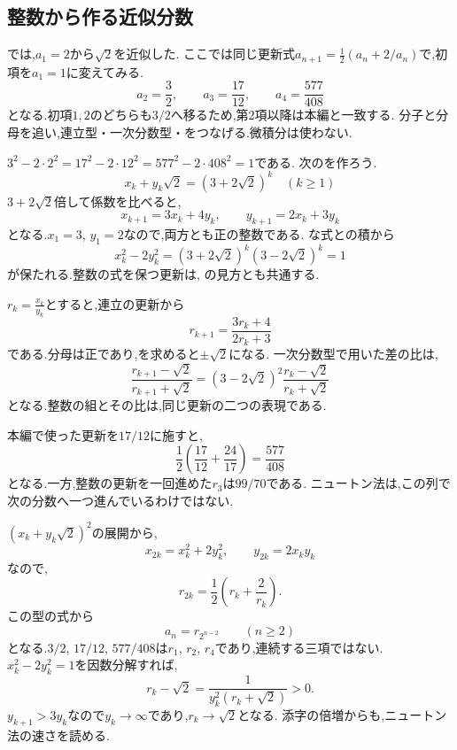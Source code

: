 \subsection{整数から作る近似分数}\label{節：ペル方程式と近似分数}
  では,$a_1=2$から$\sqrt2$を近似した.
  ここでは同じ更新式$a_{n+1}=\frac12(a_n+2/a_n)$で,初項を$a_1=1$に変えてみる.
  \[
    a_2=\frac32,\qquad a_3=\frac{17}{12},\qquad a_4=\frac{577}{408}
  \]
  となる.初項$1,2$のどちらも$3/2$へ移るため,第2項以降は本編と一致する.
  分子と分母を追い,連立型・一次分数型・をつなげる.微積分は使わない.

  $3^2-2\cdot2^2=17^2-2\cdot12^2=577^2-2\cdot408^2=1$である.
  次のを作ろう.
  \[
    x_k+y_k\sqrt2=(3+2\sqrt2)^k\quad(k\ge1)
  \]
  $3+2\sqrt2$倍して係数を比べると,
  \[
    x_{k+1}=3x_k+4y_k,\qquad y_{k+1}=2x_k+3y_k
  \]
  となる.$x_1=3$, $y_1=2$なので,両方とも正の整数である.
  な式との積から
  \[
    x_k^2-2y_k^2=(3+2\sqrt2)^k(3-2\sqrt2)^k=1
  \]
  が保たれる.整数の式を保つ更新は,
  の見方とも共通する.

  $r_k=\frac{x_k}{y_k}$とすると,連立の更新から
  \[
    r_{k+1}=\frac{3r_k+4}{2r_k+3}
  \]
  である.分母は正であり,を求めると$\pm\sqrt2$になる.
  一次分数型で用いた差の比は,
  \[
    \frac{r_{k+1}-\sqrt2}{r_{k+1}+\sqrt2}
    =(3-2\sqrt2)^2
      \frac{r_k-\sqrt2}{r_k+\sqrt2}
  \]
  となる.整数の組とその比は,同じ更新の二つの表現である.

  本編で使った更新を$17/12$に施すと,
  \[
    \frac12\left(\frac{17}{12}+\frac{24}{17}\right)=\frac{577}{408}
  \]
  となる.一方,整数の更新を一回進めた$r_3$は$99/70$である.
  ニュートン法は,この列で次の分数へ一つ進んでいるわけではない.

  $(x_k+y_k\sqrt2)^2$の展開から,
  \[
    x_{2k}=x_k^2+2y_k^2,\qquad y_{2k}=2x_ky_k
  \]
  なので,
  \[
    r_{2k}=\frac12\left(r_k+\frac2{r_k}\right).
  \]
  この型の式から
  \[
    a_n=r_{2^{n-2}}\qquad(n\ge2)
  \]
  となる.$3/2$, $17/12$, $577/408$は$r_1$, $r_2$, $r_4$であり,連続する三項ではない.
  \BookFigPellDoubling
  $x_k^2-2y_k^2=1$を因数分解すれば,
  \[
    r_k-\sqrt2=\frac1{y_k^2(r_k+\sqrt2)}>0.
  \]
  $y_{k+1}>3y_k$なので$y_k\to\infty$であり,$r_k\to\sqrt2$となる.
  添字の倍増からも,ニュートン法の速さを読める.

